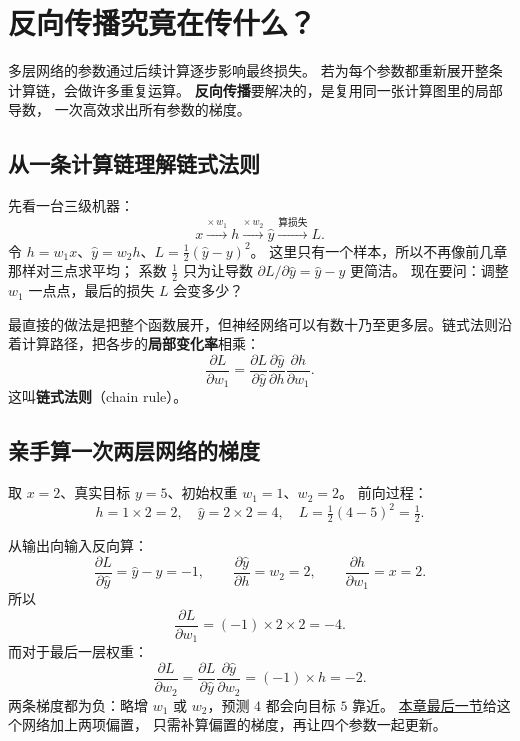 \chapterrule
\section{反向传播究竟在传什么？}
\label{concept:backprop}
\label{intro:backpropagation}

多层网络的参数通过后续计算逐步影响最终损失。
若为每个参数都重新展开整条计算链，会做许多重复运算。
\textbf{反向传播}要解决的，是复用同一张计算图里的局部导数，
一次高效求出所有参数的梯度。

\subsection{从一条计算链理解链式法则}

先看一台三级机器：
\[
x\xrightarrow{\times\,w_1}h
\xrightarrow{\times\,w_2}\widehat{y}
\xrightarrow{\text{算损失}}L.
\]
令 $h=w_1x$、$\widehat{y}=w_2h$、$L=\tfrac12(\widehat{y}-y)^2$。
这里只有一个样本，所以不再像前几章那样对三点求平均；
系数 $\tfrac12$ 只为让导数 $\partial L/\partial\widehat{y}=\widehat{y}-y$ 更简洁。
现在要问：调整 $w_1$ 一点点，最后的损失 $L$ 会变多少？

最直接的做法是把整个函数展开，但神经网络可以有数十乃至更多层。链式法则沿着计算路径，把各步的\textbf{局部变化率}相乘：
\begin{equation}
\boxed{\frac{\partial L}{\partial w_1}
=\frac{\partial L}{\partial\widehat{y}}
\frac{\partial\widehat{y}}{\partial h}
\frac{\partial h}{\partial w_1}.}
\label{eq:chain-three}
\end{equation}
这叫\textbf{链式法则}（chain rule）。

\subsection{亲手算一次两层网络的梯度}
\label{sec:backprop-weight-gradients}

取 $x=2$、真实目标 $y=5$、初始权重 $w_1=1$、$w_2=2$。
前向过程：
\[
h=1\times2=2,\quad
\widehat{y}=2\times2=4,\quad
L=\tfrac12(4-5)^2=\tfrac12.
\]

从输出向输入反向算：
\[
\frac{\partial L}{\partial\widehat{y}}
=\widehat{y}-y=-1,\qquad
\frac{\partial\widehat{y}}{\partial h}=w_2=2,\qquad
\frac{\partial h}{\partial w_1}=x=2.
\]
所以
\[
\boxed{\frac{\partial L}{\partial w_1}
=(-1)\times2\times2=-4.}
\]
而对于最后一层权重：
\[
\frac{\partial L}{\partial w_2}
=\frac{\partial L}{\partial\widehat{y}}
\frac{\partial\widehat{y}}{\partial w_2}
=(-1)\times h=-2.
\]
两条梯度都为负：略增 $w_1$ 或 $w_2$，预测 $4$ 都会向目标 $5$ 靠近。
\hyperref[sec:end-to-end-step]{本章最后一节}给这个网络加上两项偏置，
只需补算偏置的梯度，再让四个参数一起更新。

